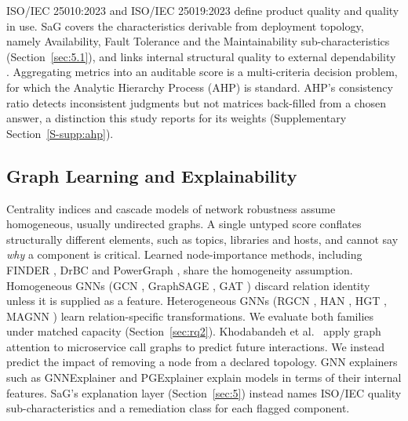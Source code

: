 \documentclass[preprint,3p]{elsarticle}
\begin{document}
ISO/IEC 25010:2023 \cite{iso25010_2023} and ISO/IEC 25019:2023 \cite{iso25019_2023} define product quality and quality in use. SaG covers the characteristics derivable from deployment topology, namely Availability, Fault Tolerance and the Maintainability sub-characteristics (Section~\ref{sec:5.1}), and links internal structural quality to external dependability \cite{iso25023_2016,iso25021_2012}. Aggregating metrics into an auditable score is a multi-criteria decision problem, for which the Analytic Hierarchy Process (AHP) \cite{saaty1980ahp} is standard. AHP's consistency ratio detects inconsistent judgments but not matrices back-filled from a chosen answer, a distinction this study reports for its weights (Supplementary Section~\ref{S-supp:ahp}).

\subsection{Graph Learning and Explainability}
\label{sec:2.4}

Centrality indices \cite{freeman1977centrality,brandes2001faster,brin1998pagerank,newman2010networks} and cascade models of network robustness \cite{albert2000error,motter2002cascade,buldyrev2010cascade} assume homogeneous, usually undirected graphs. A single untyped score conflates structurally different elements, such as topics, libraries and hosts, and cannot say \emph{why} a component is critical. Learned node-importance methods, including FINDER \cite{fan2020keyplayers}, DrBC \cite{fan2019learning} and PowerGraph \cite{varbella2024powergraph}, share the homogeneity assumption. Homogeneous GNNs (GCN \cite{kipf2017semi}, GraphSAGE \cite{hamilton2017inductive}, GAT \cite{velickovic2018graph}) discard relation identity unless it is supplied as a feature. Heterogeneous GNNs (RGCN \cite{schlichtkrull2018rgcn}, HAN \cite{wang2019han}, HGT \cite{hu2020hgt}, MAGNN \cite{fu2020magnn}) learn relation-specific transformations. We evaluate both families under matched capacity (Section~\ref{sec:rq2}). Khodabandeh et al.~\cite{khodabandeh2025linkpred} apply graph attention to microservice call graphs to predict future interactions. We instead predict the impact of removing a node from a declared topology. GNN explainers such as GNNExplainer \cite{ying2019gnnexplainer} and PGExplainer \cite{luo2020pgexplainer} explain models in terms of their internal features. SaG's explanation layer (Section~\ref{sec:5}) instead names ISO/IEC quality sub-characteristics and a remediation class for each flagged component.
\end{document}
